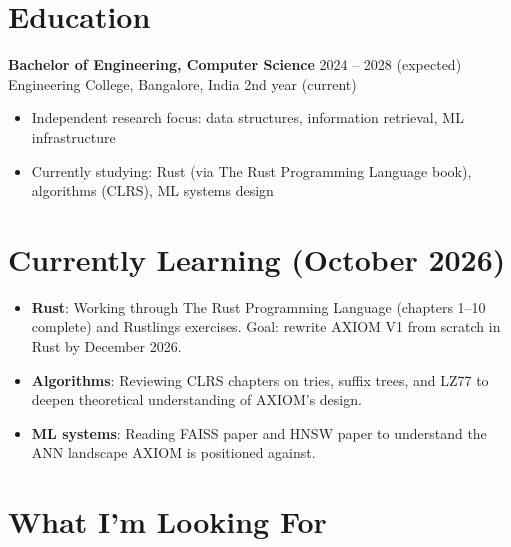 \documentclass[11pt,a4paper]{article}
\begin{document}
\section*{Education}

\textbf{Bachelor of Engineering, Computer Science} \hfill 2024 -- 2028 (expected)\\
Engineering College, Bangalore, India \hfill 2nd year (current)

\begin{itemize}
\item Independent research focus: data structures, information retrieval, ML infrastructure
\item Currently studying: Rust (via The Rust Programming Language book), algorithms (CLRS), ML systems design
\end{itemize}

\section*{Currently Learning (October 2026)}

\begin{itemize}
\item \textbf{Rust}: Working through The Rust Programming Language (chapters 1--10 complete) and Rustlings exercises. Goal: rewrite AXIOM V1 from scratch in Rust by December 2026.
\item \textbf{Algorithms}: Reviewing CLRS chapters on tries, suffix trees, and LZ77 to deepen theoretical understanding of AXIOM's design.
\item \textbf{ML systems}: Reading FAISS paper and HNSW paper to understand the ANN landscape AXIOM is positioned against.
\end{itemize}

\section*{What I'm Looking For}
\end{document}
